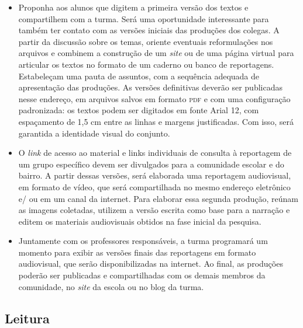 \documentclass[12pt]{extarticle}
\begin{document}
\begin{itemize}
\item
  Proponha aos alunos que digitem a primeira versão dos textos e
  compartilhem com a turma. Será uma oportunidade interessante para
  também ter contato com as versões iniciais das produções dos colegas.
  A partir da discussão sobre os temas, oriente eventuais reformulações
  nos arquivos e combinem a construção de um \emph{site} ou de uma
  página virtual para articular os textos no formato de um caderno ou
  banco de reportagens. Estabeleçam uma pauta de assuntos, com a
  sequência adequada de apresentação das produções. As versões
  definitivas deverão ser publicadas nesse endereço, em arquivos salvos
  em formato \textsc{pdf} e com uma configuração padronizada: os textos podem ser
  digitados em fonte Arial 12, com espaçamento de 1,5 cm entre as linhas
  e margens justificadas. Com isso, será garantida a identidade visual
  do conjunto.
\item
  O \emph{link} de acesso ao material e links individuais de consulta à
  reportagem de um grupo específico devem ser divulgados para a
  comunidade escolar e do bairro. A partir dessas versões, será
  elaborada uma reportagem audiovisual, em formato de vídeo, que será
  compartilhada no mesmo endereço eletrônico e/ ou em um canal da
  internet. Para elaborar essa segunda produção, reúnam as imagens
  coletadas, utilizem a versão escrita como base para a narração e
  editem os materiais audiovisuais obtidos na fase inicial da pesquisa.
\item
  Juntamente com os professores responsáveis, a turma programará um
  momento para exibir as versões finais das reportagens em formato
  audiovisual, que serão disponibilizadas na internet. Ao final, as
  produções poderão ser publicadas e compartilhadas com os demais
  membros da comunidade, no \emph{site} da escola ou no blog da turma.
\end{itemize}

\subsection{Leitura}


\end{document}

